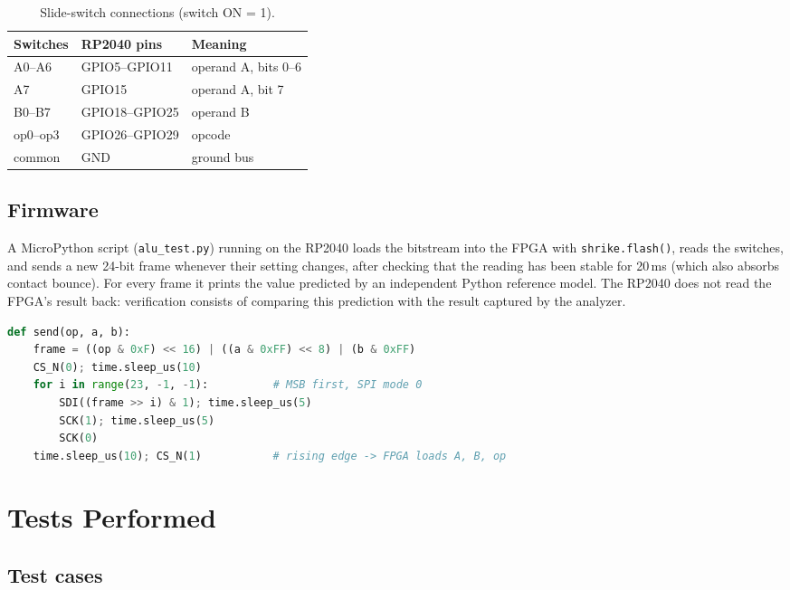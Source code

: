 \documentclass[12pt,a4paper,twoside]{article}
\begin{document}
\begin{table}[H]
\centering
\caption{Slide-switch connections (switch ON = 1).}
\label{tab:switchpins}
\begin{tabular}{@{}lll@{}}
\toprule
\textbf{Switches} & \textbf{RP2040 pins} & \textbf{Meaning} \\
\midrule
A0--A6 & GPIO5--GPIO11 & operand A, bits 0--6 \\
A7     & GPIO15        & operand A, bit 7 \\
B0--B7 & GPIO18--GPIO25 & operand B \\
op0--op3 & GPIO26--GPIO29 & opcode \\
common & GND & ground bus \\
\bottomrule
\end{tabular}
\end{table}

\subsection{Firmware}

A MicroPython script (\texttt{alu\_test.py}) running on the RP2040
loads the \gls{bitstream} into the FPGA with \texttt{shrike.flash()}, reads the
switches, and sends a new 24-bit frame whenever their setting changes, after
checking that the reading has been stable for 20\,ms (which also absorbs contact
bounce). For every frame it prints the value predicted by an independent Python
reference model. The RP2040 does not read the FPGA's result
back: verification consists of comparing this prediction with the result captured
by the analyzer.

\begin{lstlisting}[language=Python, caption={Frame transmission in \texttt{alu\_test.py}.}, label={lst:send}]
def send(op, a, b):
    frame = ((op & 0xF) << 16) | ((a & 0xFF) << 8) | (b & 0xFF)
    CS_N(0); time.sleep_us(10)
    for i in range(23, -1, -1):          # MSB first, SPI mode 0
        SDI((frame >> i) & 1); time.sleep_us(5)
        SCK(1); time.sleep_us(5)
        SCK(0)
    time.sleep_us(10); CS_N(1)           # rising edge -> FPGA loads A, B, op
\end{lstlisting}

\section{Tests Performed}

\subsection{Test cases}
\end{document}
